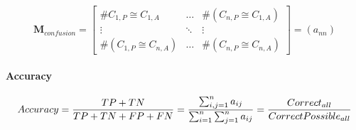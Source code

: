 \documentclass[10pt]{article}
\newif\ifen
\newif\ifde
\newcommand{\en}[1]{\ifen#1\fi}
\newcommand{\de}[1]{\ifde#1\fi}
\begin{document}
			 	\de{Zum Schluß besitzt die Confusion Matrix folgenden Aufbau, wobei die Anzahl von Elementen in der Klasse \(C_{i,P}\) vorhergesagt wurde, obwohl (\(\boldsymbol{\cong}\)) es hätte Klasse \(C_{j,A}\) sein müssen:}
				\en{Finally, the Confusion Matrix has the following structure, where the number of elements in the class \(C_{i,P}\) was predicted although (\(\boldsymbol{\cong}\)) it should have been class \(C_{j,A}\):}

				\begin{equation}
					\boldsymbol{M}_{confusion} = \begin{bmatrix}
						\#C_{1,P}\boldsymbol{\cong} C_{1,A} & \dots & \#(C_{n,P}\boldsymbol{\cong} C_{1,A}) \\
						\vdots & \ddots & \vdots \\
						\#(C_{1,P}\boldsymbol{\cong} C_{n,A}) & \dots & \#(C_{n,P}\boldsymbol{\cong} C_{n,A})
					\end{bmatrix} = (a_{nn})
				\end{equation}

			\paragraph{Accuracy}
				\de{Die \textbf{Top-1-Genauigkeit} ist wahrscheinlich die wichtigste Genauigkeit. Sie sagt sagt aus, zu wieviel Prozent die jeweils beste Aussage des Modells auf die Daten des Validierungssets mit der erwarteten Klasse übereinstimmt.}
				\en{\textbf{Top-1 accuracy} is probably the most important accuracy. It tells one the percentage of the model's best prediction of the data in the validation set that matches the expected class.}

				\begin{equation}
					Accuracy = {{TP + TN} \over {TP + TN + FP + FN}} = {{\sum_{i,j=1}^{n} a_{ij}} \over {\sum_{i=1}^{n} \sum_{j=1}^{n} a_{ij}}} = {{Correct_{all}} \over {CorrectPossible_{all}}}
				\end{equation}

				\de{Die \textbf{Top-5-Genauigkeit} ist eine weitere Genauigkeitsangabe. Jedoch wird hier nicht nur der beste Treffer einbezogen, sondern auch die nächsten weiteren vier. Sobald die richtige Klasse innerhalb der ersten fünf vorhergesagten Klassen gefunden werden kann, so ist auch diese Vorhersage wahr:}
				\en{The \textbf{Top 5 Accuracy} is another accuracy specification. However, not only the best hit is included here, but also the next four. As soon as the correct class can be found within the first five predicted classes, this prediction is also true:}
				
\end{document}
